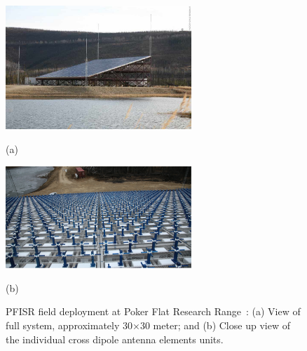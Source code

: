 
\begin{figure}[htb]
  \begin{minipage}[t]{0.49\linewidth}\centering
    \includegraphics[width=7cm]{amisrimage2}
    \medskip
    \centerline{(a)}
  \end{minipage}\hfill
  \begin{minipage}[t]{0.49\linewidth}\centering
    \includegraphics[width=7cm]{amisrface}
    \medskip
    \centerline{(b)}
  \end{minipage}
  \caption{PFISR field deployment at Poker Flat Research Range~\citep{Valentic:2013jg}: (a) View of full system, approximately 30$\times$30 meter; and (b) Close up view of the individual cross dipole antenna elements units. }
  \label{fig:amisrpic}
\end{figure}

